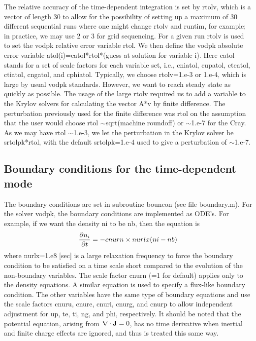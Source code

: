 \documentclass [12pt]{article}
\def\parder#1#2{{\partial#1\over\partial#2}}
\def\tild{$\sim$}
\begin{document}
The relative accuracy of the time-dependent integration is set by rtolv, which
is a vector of length 30 to allow for the possibility of setting up a maximum
of 30 different sequential runs where one might change rtolv and runtim, for
example; in practice, we may use 2 or 3 for grid sequencing.  For a given run
rtolv is used to set the {\sf vodpk} relative error variable {\sf rtol}.  We
then define the {\sf vodpk} absolute error variable {\sf
atol(i)=catol*rtol*(guess at solution for variable i)}.  Here {\sf catol}
stands for a set of scale factors for each variable set, i.e., {\sf cniatol,
cupatol, cteatol, ctiatol, cngatol,} and {\sf cphiatol}.  Typically, we choose
{\sf rtolv}=1.e-3 or 1.e-4, which is large by usual {\sf vodpk} standards.
However, we want to reach steady state as quickly as possible.  The usage of
the large {\sf rtolv} required us to add a variable to the Krylov solvers for
calculating the vector A*v by finite difference.  The perturbation previously
used for the finite difference was rtol on the assumption that the user would
choose {\sf rtol} \tild sqrt(machine roundoff) or \tild 1.e-7 for the Cray.
As we may have {\sf rtol} \tild 1.e-3, we let the perturbation in the Krylov
solver be {\sf srtolpk*rtol}, with the default {\sf srtolpk}=1.e-4 used to
give a perturbation of \tild 1.e-7.

\subsection{Boundary conditions for the time-dependent mode}

The boundary conditions are set in subroutine bouncon (see file boundary.m).
For the solver {\sf vodpk}, the boundary conditions are implemented as ODE's.
For example, if we want the density {\sf ni} to be {\sf nb}, then the equation
is
\begin{equation}
  \label{bndryeq}
  \parder{n_i}{t} = -cnurn\times nurlx (ni - nb)
\end{equation}
where {\sf nurlx}=1.e8 [sec] is a large relaxation frequency to force the
boundary condition to be satisfied on a time scale short compared to the
evolution of the non-boundary variables.  The scale factor {\sf cnurn} (=1 for
default) applies only to the density equations.  A similar equation is used to
specify a flux-like boundary condition.  The other variables have the same
type of boundary equations and use the scale factors {\sf cnuru, cnure, cnuri,
cnurg,} and {\sf cnurp} to allow independent adjustment for up, te, ti, ng,
and phi, respectively.  It should be noted that the potential equation,
arising from $\nabla \cdot {\bf J}=0$, has no time derivative when inertial
and finite charge effects are ignored, and thus is treated this same way.
\end{document}
